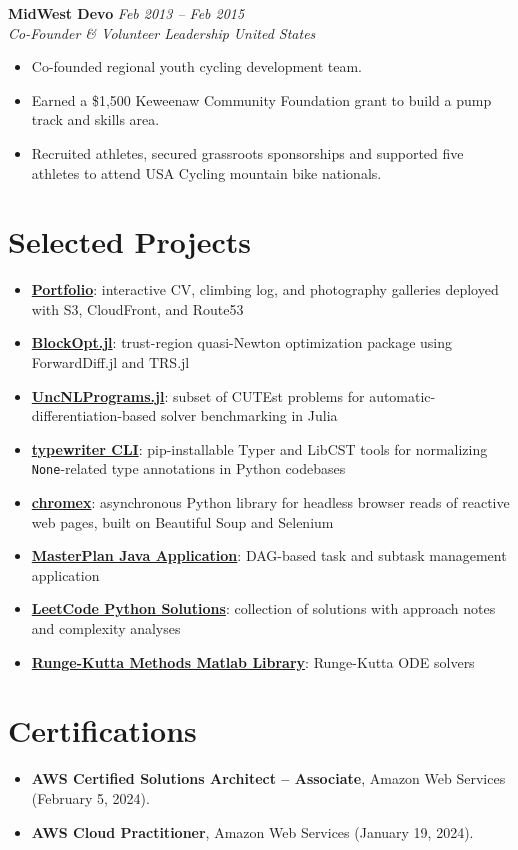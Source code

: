 \documentclass[10pt,letterpaper]{article}
\newcommand{\resumeItem}[1]{\item \small #1}
\newcommand{\resumeLink}[2]{\href{#1}{#2}}
\newcommand{\resumeSubheading}[4]{%
  \textbf{#1} \hfill \small{\textit{#2}}\\
  \small{\textit{#3}} \hfill \small{\textit{#4}}\par
}
\begin{document}
\resumeSubheading{MidWest Devo}{Feb 2013 -- Feb 2015}{Co-Founder \& Volunteer Leadership}{United States}
\begin{itemize}
  \resumeItem{Co-founded regional youth cycling development team.}
  \resumeItem{Earned a \$1,500 Keweenaw Community Foundation grant to build a pump track and skills area.}
  \resumeItem{Recruited athletes, secured grassroots sponsorships and supported five athletes to attend USA Cycling mountain bike nationals.}
\end{itemize}

\section*{Selected Projects}
\begin{itemize}
  \resumeItem{\textbf{\resumeLink{https://github.com/danphenderson/dev-danhenderson}{Portfolio}}: interactive CV, climbing log, and photography galleries deployed with S3, CloudFront, and Route53}
  \resumeItem{\textbf{\resumeLink{https://github.com/danphenderson/BlockOpt.jl}{BlockOpt.jl}}: trust-region quasi-Newton optimization package using ForwardDiff.jl and TRS.jl}
  \resumeItem{\textbf{\resumeLink{https://github.com/danphenderson/UncNLPrograms.jl}{UncNLPrograms.jl}}: subset of CUTEst problems for automatic-differentiation-based solver benchmarking in Julia}
    \resumeItem{\textbf{\resumeLink{https://github.com/danphenderson/python-typewriter}{typewriter CLI}}: pip-installable Typer and LibCST tools for normalizing \texttt{None}-related type annotations in Python codebases}
  \resumeItem{\textbf{\resumeLink{https://github.com/danphenderson/python-chromex}{chromex}}: asynchronous Python library for headless browser reads of reactive web pages, built on Beautiful Soup and Selenium}
  \resumeItem{\textbf{\resumeLink{https://github.com/danphenderson/masterplan-app}{MasterPlan Java Application}}: DAG-based task and subtask management application}
  \resumeItem{\textbf{\resumeLink{https://github.com/danphenderson/leetcode-solutions}{LeetCode Python Solutions}}: collection of solutions with approach notes and complexity analyses}
  \resumeItem{\textbf{\resumeLink{https://github.com/danphenderson/runge-kutta-matlab}{Runge-Kutta Methods Matlab Library}}: Runge-Kutta ODE solvers}
\end{itemize}

\section*{Certifications}
\begin{itemize}
  \resumeItem{\textbf{AWS Certified Solutions Architect -- Associate}, Amazon Web Services (February 5, 2024).}
  \resumeItem{\textbf{AWS Cloud Practitioner}, Amazon Web Services (January 19, 2024).}
\end{itemize}
\end{document}
